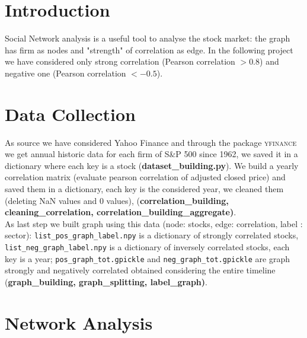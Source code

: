 \documentclass[sigchi]{acmart}
\begin{document}
%

%
\maketitle

\section{Introduction}
Social Network analysis is a useful tool to analyse the stock market: the graph has firm as nodes and "strength" of correlation as edge. In the following project we have considered only strong correlation (Pearson correlation $> 0.8$) and negative one (Pearson correlation $< -0.5$).
\section{Data Collection}
As source we have considered Yahoo Finance and through the package \textsc{yfinance} we get annual historic data for each firm of S\&P 500 since 1962, we saved it in a dictionary where each key is a stock (\textbf{dataset\_building.py}). We build a  yearly correlation matrix (evaluate pearson correlation of adjusted closed price) and saved them in a dictionary, each key is the considered year, we cleaned them (deleting NaN values and 0 values),
(\textbf{correlation\_building, cleaning\_correlation, correlation\_building\_aggregate)}.\\
As last step we built graph using this data (node: stocks, edge: correlation, label : sector): \texttt{list\_pos\_graph\_label.npy} is a dictionary of strongly correlated stocks,\\ \texttt{list\_neg\_graph\_label.npy} is a dictionary of inversely correlated stocks, each key is a year; \texttt{pos\_graph\_tot.gpickle} and \texttt{neg\_graph\_tot.gpickle} are graph strongly and negatively correlated obtained considering the entire timeline (\textbf{graph\_building, graph\_splitting, label\_graph)}. 
\section{Network Analysis}
\end{document}
